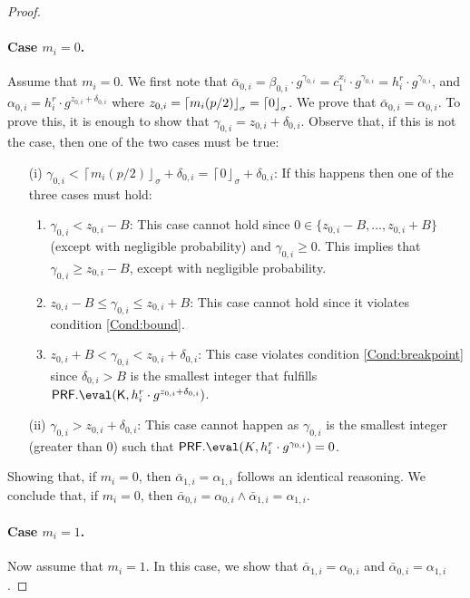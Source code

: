 \begin{proof}
\paragraph{Case $m_i=0$.} Assume that $m_i=0$. We first note that $\bar \alpha_{0,i}=\beta_{0,i}\cdot g^{\gamma_{0,i}}=c_1^{x_i}\cdot g^{\gamma_{0,i}}=h_i^r\cdot g^{\gamma_{0,i}}$, and $\alpha_{0,i}=h_i^r\cdot g^{z_{0,i}+ \delta_{0,i}} $ where $z_{0,i}=\left\lceil m_i(p/2)\right\rfloor_\sigma=\left\lceil 0 \right\rfloor_{\sigma}$.%
We prove that $\bar \alpha_{0,i}=\alpha_{0,i}$. To prove this, it is enough to show that $\gamma_{0,i}=z_{0,i}+ \delta_{0,i}$. Observe that, if this is not the case, then one of the two cases must be true:
\begin{enumerate}
    \item[(i)] $\gamma_{0,i}<\left\lceil m_i(p/2)\right\rfloor_\sigma+ \delta_{0,i}=\left\lceil 0\right\rfloor_\sigma+ \delta_{0,i}$: If this happens then one of the three cases must hold: \begin{enumerate}
        \item $\gamma_{0,i}<z_{0,i} - B$: This case cannot hold since $0\in\{ z_{0,i}- B , \dots, z_{0,i}+ B \}$ (except with negligible probability) and $\gamma_{0,i}\geq 0$. This implies that $\gamma_{0,i}\geq z_{0,i} - B$, except with negligible probability.
        \item $z_{0,i} - B\leq \gamma_{0,i}\leq z_{0,i} + B$: This case cannot hold since it violates condition \ref{Cond:bound}.
        \item $ z_{0,i}+ B<\gamma_{0,i}<z_{0,i}+ \delta_{0,i}$: This case violates condition \ref{Cond:breakpoint} since $\delta_{0,i}>B$ is the smallest integer that fulfills $\PRF.\eval(\key,h_i^r\cdot g^{z_{0,i}+ \delta_{0,i}})$.
    \end{enumerate}
    \item[(ii)] $\gamma_{0,i}>z_{0,i}+ \delta_{0,i}$: This case cannot happen as $\gamma_{0,i}$ is the smallest integer (greater than $0$) such that $\PRF.\eval(K,h_i^r\cdot g^{\gamma_{0,i}})=0$.  
    \end{enumerate}

Showing that, if $m_i=0$, then $\bar \alpha_{1,i}=\alpha_{1,i}$ follows an identical reasoning. We conclude that, if $m_i=0$, then $\bar \alpha_{0,i}=\alpha_{0,i} \land \bar \alpha_{1,i}=\alpha_{1,i}$.


\paragraph{Case $m_i=1$.} Now assume that $m_i=1$. In this case, we show that $\bar \alpha_{1,i}=\alpha_{0,i}$ and $\bar \alpha_{0,i}=\alpha_{1,i}$.



\end{proof}
